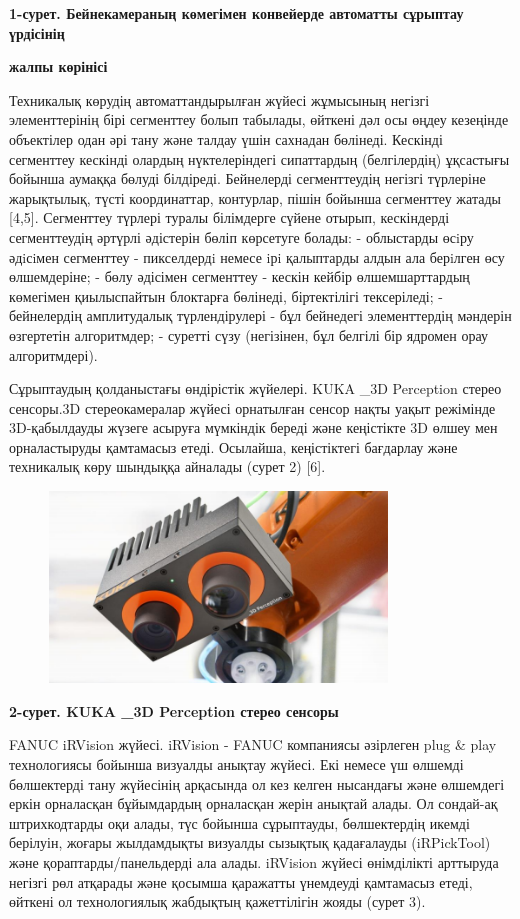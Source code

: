 {\bfseries 1-сурет. Бейнекамераның көмегімен конвейерде автоматты сұрыптау
үрдісінің}

{\bfseries жалпы көрінісі}

Техникалық көрудің автоматтандырылған жүйесі жұмысының негізгі
элементтерінің бірі сегменттеу болып табылады, өйткені дәл осы өңдеу
кезеңінде объектілер одан әрі тану және талдау үшін сахнадан бөлінеді.
Кескінді сегменттеу кескінді олардың нүктелеріндегі сипаттардың
(белгілердің) ұқсастығы бойынша аумаққа бөлуді білдіреді. Бейнелерді
сегменттеудің негізгі түрлеріне жарықтылық, түсті координаттар,
контурлар, пішін бойынша сегменттеу жатады {[}4,5{]}. Сегменттеу түрлері
туралы білімдерге сүйене отырып, кескіндерді сегменттеудің әртүрлі
әдістерін бөліп көрсетуге болады: - облыстарды өсiру әдiсiмен сегменттеу
- пикселдердi немесе iрi қалыптарды алдын ала берiлген өсу өлшемдеріне;
- бөлу әдісімен сегменттеу - кескін кейбір өлшемшарттардың көмегімен
қиылыспайтын блоктарға бөлінеді, біртектілігі тексеріледі; - бейнелердің
амплитудалық түрлендірулері - бұл бейнедегі элементтердің мәндерін
өзгертетін алгоритмдер; - суретті сүзу (негізінен, бұл белгілі бір
ядромен орау алгоритмдері).

Сұрыптаудың қолданыстағы өндірістік жүйелері. KUKA \_3D Perception
стерео сенсоры.3D стереокамералар жүйесі орнатылған сенсор нақты уақыт
режімінде 3D-қабылдауды жүзеге асыруға мүмкіндік береді және кеңістікте
3D өлшеу мен орналастыруды қамтамасыз етеді. Осылайша, кеңістіктегі
бағдарлау және техникалық көру шындыққа айналады (сурет 2) {[}6{]}.


\begin{figure}[H]
	\centering
	\includegraphics[width=0.8\textwidth]{media/ict2/image169}
	\caption*{}
\end{figure}


{\bfseries 2-сурет. KUKA \_3D Perception стерео сенсоры}

FANUC iRVision жүйесі. iRVision - FANUC компаниясы әзірлеген plug \&
play технологиясы бойынша визуалды анықтау жүйесі. Екі немесе үш өлшемді
бөлшектерді тану жүйесінің арқасында ол кез келген нысандағы және
өлшемдегі еркін орналасқан бұйымдардың орналасқан жерін анықтай алады.
Ол сондай-ақ штрихкодтарды оқи алады, түс бойынша сұрыптауды,
бөлшектердің икемді берілуін, жоғары жылдамдықты визуалды сызықтық
қадағалауды (iRPickTool) және қораптарды/панельдерді ала алады. iRVision
жүйесі өнімділікті арттыруда негізгі рөл атқарады және қосымша қаражатты
үнемдеуді қамтамасыз етеді, өйткені ол технологиялық жабдықтың
қажеттілігін жояды (сурет 3).


